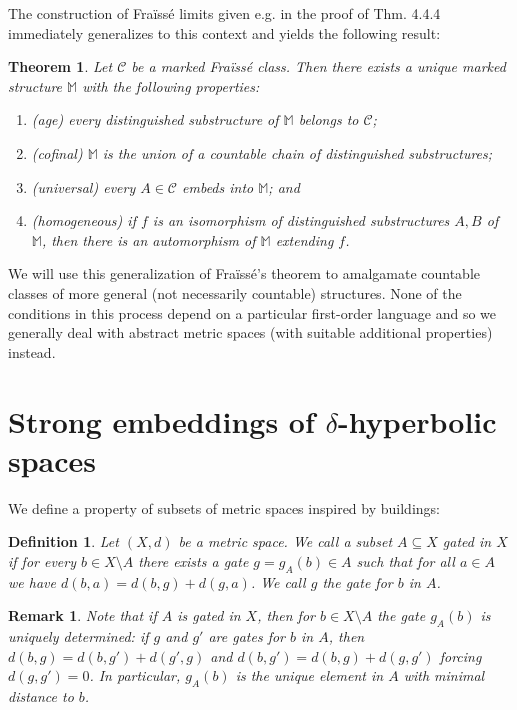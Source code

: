 \documentclass{amsart}
\renewcommand{\d}{\delta}
\newcommand{\M}{\mathbb{M}}
\newcommand{\C}{\mathcal{C}}
\newtheorem{theorem}[defi]{Theorem}
\newtheorem{definition}[defi]{Definition}
\newtheorem{remark}[defi]{Remark}
\begin{document}
The construction of Fra\"iss\'e limits given e.g. in the proof of \cite{TZmodel theory} Thm. 4.4.4 immediately generalizes to this context and yields the following result:

\begin{theorem}\label{thm:generalized Fraisse}
Let $\C$ be a marked Fra\"iss\'e class.
Then there exists a unique marked structure $\mathbb{M}$  with the following properties:
\begin{enumerate}
\item (age) every distinguished substructure of $\mathbb{M}$ belongs to $\C$;
\item (cofinal) $\M$ is the union of a countable chain of distinguished substructures;
\item (universal) every $A\in\C$ embeds into $\mathbb{M}$; and
\item (homogeneous) if $f$ is an isomorphism of distinguished substructures $A, B$ of $\mathbb{M}$, then there is an automorphism of $\mathbb{M}$ extending $f$.
\end{enumerate}

\end{theorem}



We will use this generalization of Fra\"iss\'e's theorem to amalgamate countable classes of more general (not necessarily countable) structures. None of the conditions in this process depend on a particular first-order language and so we generally deal with abstract metric spaces (with suitable additional properties) instead.

\section{Strong embeddings of $\d$-hyperbolic spaces}\label{sec:strong embeddings}


We define a property of subsets of metric spaces inspired by buildings:

\begin{definition}\label{def:gated}
Let $(X,d)$ be a metric space. We call a subset $A\subseteq X$ \emph{gated} in $X$ if for every $b\in X\setminus A$ there exists a \emph{gate} $g=g_A(b)\in A$  such that for all $a\in A$ we have $d(b,a)=d(b,g)+d(g,a)$. We call $g$ the gate for $b$ in $A$.
\end{definition}

\begin{remark}\label{rem:unique gate}
Note that if $A$ is gated in $X$, then for $b\in X\setminus A$ the gate $g_A(b)$ is uniquely determined: if $g$ and $g'$ are gates for $b$  in $A$, then $d(b, g)=d(b,g')+d(g',g)$ and $d(b,g')=d(b,g)+d(g,g')$ forcing $d(g,g')=0$. In particular, $g_A(b)$ is the unique element in $A$ with minimal distance to $b$.
\end{remark}
\end{document}

